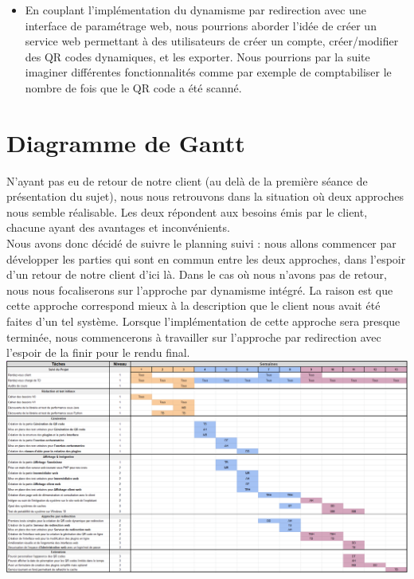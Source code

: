 \documentclass[a4paper,12pt]{article}
\begin{document}
\begin{itemize}
    \item En couplant l'implémentation du dynamisme par redirection avec une interface de paramétrage web, nous pourrions aborder l'idée de créer un service web permettant à des utilisateurs de créer un compte, créer/modifier des QR codes dynamiques, et les exporter. Nous pourrions par la suite imaginer différentes fonctionnalités comme par exemple de comptabiliser le nombre de fois que le QR code a été scanné.
  
\end{itemize}

\section{Diagramme de Gantt}

N'ayant pas eu de retour de notre client (au delà de la première séance de présentation du sujet), nous nous retrouvons dans la situation où deux approches nous semble réalisable. Les deux répondent aux besoins émis par le client, chacune ayant des avantages et inconvénients.\\

Nous avons donc décidé de suivre le planning suivi : nous allons commencer par développer les parties qui sont en commun entre les deux approches, dans l'espoir d'un retour de notre client d'ici là. Dans le cas où nous n'avons pas de retour, nous nous focaliserons sur l'approche par dynamisme intégré. La raison est que cette approche correspond mieux à la description que le client nous avait été faites d'un tel système. Lorsque l'implémentation de cette approche sera presque terminée, nous commencerons à travailler sur l'approche par redirection avec l'espoir de la finir pour le rendu final.\\ 

\noindent\includegraphics[width=\textwidth]{gantt.png}
\end{document}
